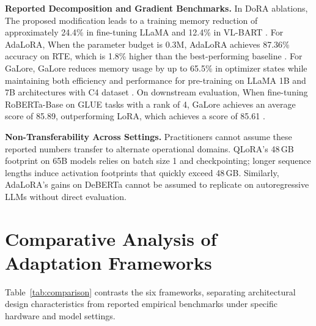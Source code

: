 \documentclass[11pt,a4paper]{article}
\begin{document}
\textbf{Reported Decomposition and Gradient Benchmarks.} In DoRA ablations, The proposed modification leads to a training memory reduction of approximately 24.4\% in fine-tuning LLaMA and 12.4\% in VL-BART \cite{liu2024dora}. For AdaLoRA, When the parameter budget is 0.3M, AdaLoRA achieves 87.36\% accuracy on RTE, which is 1.8\% higher than the best-performing baseline \cite{zhang2023adalora}. For GaLore, GaLore reduces memory usage by up to 65.5\% in optimizer states while maintaining both efficiency and performance for pre-training on LLaMA 1B and 7B architectures with C4 dataset \cite{zhao2024galore}. On downstream evaluation, When fine-tuning RoBERTa-Base on GLUE tasks with a rank of 4, GaLore achieves an average score of 85.89, outperforming LoRA, which achieves a score of 85.61 \cite{zhao2024galore}.

\textbf{Non-Transferability Across Settings.} Practitioners cannot assume these reported numbers transfer to alternate operational domains. QLoRA's 48\,GB footprint on 65B models relies on batch size 1 and checkpointing; longer sequence lengths induce activation footprints that quickly exceed 48\,GB. Similarly, AdaLoRA's gains on DeBERTa cannot be assumed to replicate on autoregressive LLMs without direct evaluation.

\section{Comparative Analysis of Adaptation Frameworks}

Table~\ref{tab:comparison} contrasts the six frameworks, separating architectural design characteristics from reported empirical benchmarks under specific hardware and model settings.
\end{document}
